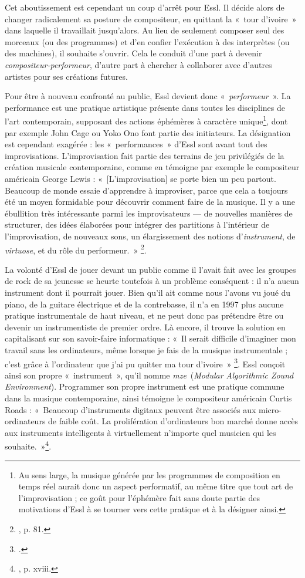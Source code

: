 \documentclass[a4paper,12pt]{article}
\newcommand{\guill}[1]{«~#1~»}
\newcommand{\maze}[0]{\emph{m\symbol{64}ze\textdegree2}}
\begin{document}
Cet aboutissement est cependant un coup d'arrêt pour Essl. Il décide alors de changer radicalement sa posture de compositeur, en quittant la \guill{tour d'ivoire} dans laquelle il travaillait jusqu'alors. Au lieu de seulement composer seul des morceaux (ou des programmes) et d'en confier l'exécution à des interprètes (ou des machines), il souhaite s'ouvrir. Cela le conduit d'une part à devenir \emph{compositeur-performeur}, d'autre part à chercher à collaborer avec d'autres artistes pour ses créations futures.

Pour être à nouveau confronté au public, Essl devient donc \guill{\emph{performeur}}. La performance est une pratique artistique présente dans toutes les disciplines de l'art contemporain, supposant des actions éphémères à caractère unique\footnote{Au sens large, la musique générée par les programmes de composition en temps réel aurait donc un aspect performatif, au même titre que tout art de l'improvisation ; ce goût pour l'éphémère fait sans doute partie des motivations d'Essl à se tourner vers cette pratique et à la désigner ainsi.}, dont par exemple John Cage ou Yoko Ono font partie des initiateurs. La désignation est cependant exagérée : les \guill{performances} d'Essl sont avant tout des improvisations. L'improvisation fait partie des terrains de jeu privilégiés de la création musicale contemporaine, comme en témoigne par exemple le compositeur américain George Lewis : \guill{[L'improvisation] se porte bien un peu partout. Beaucoup de monde essaie d'apprendre à improviser, parce que cela a toujours été un moyen formidable pour découvrir comment faire de la musique. Il y a une ébullition très intéressante parmi les improvisateurs --- de nouvelles manières de structurer, des idées élaborées pour intégrer des partitions à l'intérieur de l'improvisation, de nouveaux sons, un élargissement des notions d'\emph{instrument}, de \emph{virtuose}, et du rôle du performeur.}
\footnote{\cite{appleton1986composers}, p. 81.}.

La volonté d'Essl de jouer devant un public comme il l'avait fait avec les groupes de rock de sa jeunesse se heurte toutefois à un problème conséquent : il n'a aucun instrument dont il pourrait jouer. Bien qu'il ait comme nous l'avons vu joué du piano, de la guitare électrique et de la contrebasse, il n'a en 1997 plus aucune pratique instrumentale de haut niveau, et ne peut donc pas prétendre être ou devenir un instrumentiste de premier ordre. Là encore, il trouve la solution en capitalisant sur son savoir-faire informatique : \guill{Il serait difficile d'imaginer mon travail sans les ordinateurs, même lorsque je fais de la musique instrumentale ; c'est grâce à l'ordinateur que j'ai pu quitter ma tour d'ivoire}
\footnote{\cite{pagano}.}. Essl conçoit ainsi son propre \guill{instrument}, qu'il nomme \maze~(\emph{Modular Algorithmic Zound Environment}). Programmer son propre instrument est une pratique commune dans la musique contemporaine, ainsi témoigne le compositeur américain Curtis Roads : \guill{Beaucoup d'instruments digitaux peuvent être associés aux micro-ordinateurs de faible coût. La prolifération d'ordinateurs bon marché donne accès aux instruments intelligents à virtuellement n'importe quel musicien qui les souhaite.}\footnote{\cite{appleton1986composers}, p. xviii.}.
\end{document}
